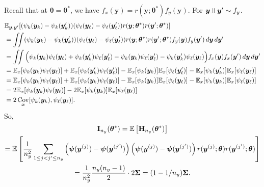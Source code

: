 \documentclass[11pt]{article}
\numberwithin{equation}{section}
\numberwithin{theorem}{section}
\def\Hb{\mathbf{H}}
\def\Ib{\mathbf{I}}
\def\fatx{\boldsymbol{x}}
\def\faty{\boldsymbol{y}}
\def\fattheta{\boldsymbol{\theta}}
\def\fatpsi{\boldsymbol{\psi}}
\def\fatSigma{\boldsymbol{\Sigma}}
\newcommand{\indep}{\rotatebox[origin=c]{90}{$\models$}}
\theoremstyle{definition}
\theoremstyle{remark}
\begin{document}
Recall that at $\fattheta=\fattheta^*$, we have $f_x(\faty)= r(\faty;\fattheta^*) f_y(\faty)$.
For $\faty \indep \faty' \sim f_y$.
\begin{equation}
\begin{aligned}
& \EE_{\faty,\faty'}[ (\psi_k(\faty_k) - \psi_k(\faty_k')) (\psi_\ell(\faty_\ell) - \psi_\ell(\faty_\ell')) r(\faty;\fattheta^*) r(\faty';\fattheta^*) ] \\
&= \iint (\psi_k(\faty_k) - \psi_k(\faty_k')) (\psi_\ell(\faty_\ell) - \psi_\ell(\faty_\ell')) r(\faty;\fattheta^*) r(\faty';\fattheta^*) f_y(\faty) f_y(\faty') \, d\faty \, d\faty' \\
&= \iint \Big( \psi_k(\faty_k)\psi_\ell(\faty_\ell) + \psi_k(\faty_k')\psi_\ell(\faty_\ell') - \psi_k(\faty_k)\psi_\ell(\faty_\ell') - \psi_k(\faty_k')\psi_\ell(\faty_\ell) \Big) f_x(\faty) f_x(\faty') \, d\faty \, d\faty' \\
&= \EE_x[\psi_k(\faty_k)\psi_\ell(\faty_\ell)] + \EE_x[\psi_k(\faty_k')\psi_\ell(\faty_\ell')] - \EE_x[\psi_k(\faty_k)]\EE_x[\psi_\ell(\faty_\ell')] - \EE_x[\psi_k(\faty_k')]\EE_x[\psi_\ell(\faty_\ell)] \\
&= \EE_x[\psi_k(\faty_k)\psi_\ell(\faty_\ell)] + \EE_x[\psi_k(\faty_k)\psi_\ell(\faty_\ell)] - \EE_x[\psi_k(\faty_k)]\EE_x[\psi_\ell(\faty_\ell)] - \EE_x[\psi_k(\faty_k)]\EE_x[\psi_\ell(\faty_\ell)] \\
&= 2\EE_x[\psi_k(\faty_k)\psi_\ell(\faty_\ell)] - 2\EE_x[\psi_k(\faty_k)]\EE_x[\psi_\ell(\faty_\ell)] \\
&= 2\Cov_{\fatx}[\psi_k(\faty_k),\psi_\ell(\faty_\ell)].
\end{aligned}
\end{equation}
So,
\begin{multline} \label{eq:EyH}
\Ib_{n_y}(\fattheta^*)
= \EE\left[ \Hb_{n_y}(\fattheta^*) \right] \\
= \EE\left[ \frac{1}{n_y^2} \sum_{1 \leq j < j' \leq n_y} \left( \fatpsi(\faty^{(j)}) - \fatpsi(\faty^{(j')}) \right)\left( \fatpsi(\faty^{(j)}) - \fatpsi(\faty^{(j')}) \right) r(\faty^{(j)};\fattheta) r(\faty^{(j')};\fattheta) \right] \\
= \frac{1}{n_y^2} \frac{n_y(n_y-1)}{2} \cdot 2\fatSigma
= (1-1/n_y) \fatSigma.
\end{multline}
\end{document}
